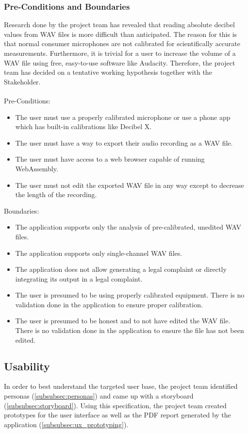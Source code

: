 \subsubsection{Pre-Conditions and Boundaries}\label{subsubsec:pre_conditions_and_boundaries}
Research done by the project team has revealed that reading absolute decibel values from WAV files is more difficult than anticipated.
The reason for this is that normal consumer microphones are not calibrated for scientifically accurate measurements\cite{stackoverflow_spl}. Furthermore, it is trivial for a user
to increase the volume of a WAV file using free, easy-to-use software like Audacity\cite{audacity}\cite{audacity_amplify}. Therefore, the project team has decided 
on a tentative working hypothesis together with the Stakeholder. \\ \\
Pre-Conditions:
\begin{itemize}
    \item The user must use a properly calibrated microphone or use a phone app which has built-in calibrations like Decibel X\cite{decibelx_ios}\cite{decibelx_android}.
    \item The user must have a way to export their audio recording as a WAV file.
    \item The user must have access to a web browser capable of running WebAssembly.
    \item The user must not edit the exported WAV file in any way except to decrease the length of the recording.
\end{itemize}
Boundaries:
\begin{itemize}
    \item The application supports only the analysis of pre-calibrated, unedited WAV files.
    \item The application supports only single-channel WAV files.
    \item The application does not allow generating a legal complaint or directly integrating its output in a legal complaint.
    \item The user is presumed to be using properly calibrated equipment. There is no validation done in the application to ensure proper calibration.
    \item The user is presumed to be honest and to not have edited the WAV file. There is no validation done in the application to ensure the file has not been edited.
\end{itemize}

\subsection{Usability}
In order to best understand the targeted user base, the project team identified personas (\ref{subsubsec:personas}) and came up with a storyboard (\ref{subsubsec:storyboard}).
Using this specification, the project team created prototypes for the user interface as well as the PDF report generated by the application (\ref{subsubsec:ux_prototyping}).

